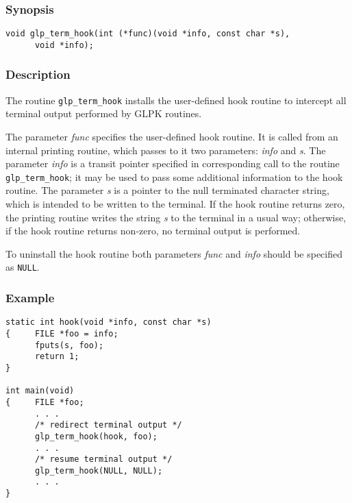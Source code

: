 \subsubsection*{Synopsis}

\begin{verbatim}
void glp_term_hook(int (*func)(void *info, const char *s),
      void *info);
\end{verbatim}

\subsubsection*{Description}

The routine \verb|glp_term_hook| installs the user-defined hook routine
to intercept all terminal output performed by GLPK routines.


The parameter {\it func} specifies the user-defined hook routine. It is
called from an internal printing routine, which passes to it two
parameters: {\it info} and {\it s}. The parameter {\it info} is a
transit pointer specified in corresponding call to the routine
\verb|glp_term_hook|; it may be used to pass some additional information
to the hook routine. The parameter {\it s} is a pointer to the null
terminated character string, which is intended to be written to the
terminal. If the hook routine returns zero, the printing routine writes
the string {\it s} to the terminal in a usual way; otherwise, if the
hook routine returns non-zero, no terminal output is performed.

To uninstall the hook routine both parameters {\it func} and {\it info}
should be specified as \verb|NULL|.

\newpage

\subsubsection*{Example}

\begin{footnotesize}
\begin{verbatim}
static int hook(void *info, const char *s)
{     FILE *foo = info;
      fputs(s, foo);
      return 1;
}

int main(void)
{     FILE *foo;
      . . .
      /* redirect terminal output */
      glp_term_hook(hook, foo);
      . . .
      /* resume terminal output */
      glp_term_hook(NULL, NULL);
      . . .
}
\end{verbatim}
\end{footnotesize}

